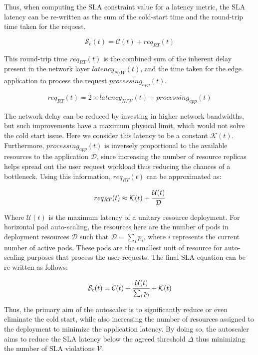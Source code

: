 Thus, when computing the SLA constraint value for a latency metric, the SLA latency can be re-written as the sum of the cold-start time and the round-trip time taken for the request.

\begin{equation}
    \mathcal{S}_{c}(t) = \mathcal{C}(t) + req_{RT}(t)
\end{equation}


This round-trip time $req_{RT}(t)$ is the combined sum of the inherent delay present in the network layer $latency_{N/W}(t)$, and the time taken for the edge application to process the request $processing_{app}(t)$.

\begin{equation}
    req_{RT}(t) = 2 \times latency_{N/W}(t) + processing_{app}(t)
\end{equation}

The network delay can be reduced by investing in higher network bandwidths, but such improvements have a maximum physical limit, which would not solve the cold start issue. Here we consider this latency to be a constant $\mathcal{K}(t)$. Furthermore, $processing_{app}(t)$ is inversely proportional to the available resources to the application $\mathcal{D}$, since increasing the number of resource replicas helps spread out the user request workload thus reducing the chances of a bottleneck. Using this information, $req_{RT}(t)$ can be approximated as:

\begin{equation}
    req_{RT}(t) \approx \mathcal{K}(t) + \cfrac{\mathcal{U}(t)}{\mathcal{D}}
\end{equation}

Where $\mathcal{U}(t)$ is the maximum latency of a unitary resource deployment. For horizontal pod auto-scaling, the resources here are the number of pods in deployment resources $\mathcal{D}$ such that $\mathcal{D} = \sum_{i} p_{i}$, where $i$ represents the current number of active pods. These pods are the smallest unit of resource for auto-scaling purposes that process the user requests. The final SLA equation can be re-written as follows:

\begin{equation}
    \mathcal{S}_{c}(t) = \mathcal{C}(t) + \cfrac{\mathcal{U}(t)}{\sum_{i} p_{i}} + \mathcal{K}(t)
    \label{eqn:sla-cold-start}
\end{equation}

Thus, the primary aim of the autoscaler is to significantly reduce or even eliminate the cold start, while also increasing the number of resources assigned to the deployment to minimize the application latency. By doing so, the autoscaler aims to reduce the SLA latency below the agreed threshold $\Delta$ thus minimizing the number of SLA violations $\mathcal{V}$.\par

